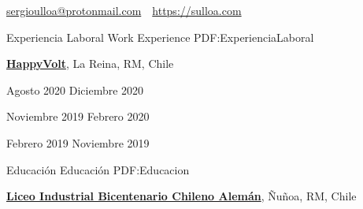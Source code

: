 \documentclass[letterpaper,yyyy,draft]{simpleresumecv}
\newcommand{\CVAuthor}{Sergio A. Ulloa B.}
\newcommand{\CVWebpage}{https://sulloa.com}
\begin{document}
\makeatletter
\let\@oddfoot\@empty{}
\let\@evenfoot\@empty{}
\makeatother

\Title{\CVAuthor}

{
    \begin{SubTitle}
    \href{mailto:sergioulloa@protonmail.com}{sergioulloa@protonmail.com}
    \,\SubBulletSymbol\,
    \href{\CVWebpage}{\url{\CVWebpage}}
    \end{SubTitle}
}

\begin{Body}


\Section
{Experiencia\newline
Laboral}
{Work Experience}
{PDF:ExperienciaLaboral}
{
    \Entry{}
    \href{https://happyvolt.com/}{\textbf{HappyVolt}},
    La Reina, RM, Chile

    \hfill
    Agosto 2020
    Diciembre 2020

    \hfill
    Noviembre 2019
    Febrero 2020

    \hfill
    Febrero 2019
    Noviembre 2019


    \begin{Detail}
    \end{Detail}


    \begin{Detail}
    \end{Detail}
}


\Section
{Educación}
{Educación}
{PDF:Educacion}
{
    \Entry{}
    \href{https://www.lichan.cl/}{\textbf{Liceo Industrial Bicentenario Chileno Alemán}},
    Ñuñoa, RM, Chile
    \hfill
     \-\- 



}
\end{Body}
\end{document}
